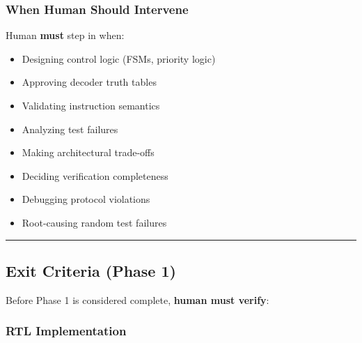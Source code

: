 \subsubsection{When Human Should Intervene}\label{cr:status:phase1-ai-human-responsibilities:when-human-should-intervene}

\begin{record}

Human \textbf{must} step in when:

\begin{itemize}
\tightlist
\item
  \hold{} Designing control logic (FSMs, priority logic)
\item
  \hold{} Approving decoder truth tables
\item
  \hold{} Validating instruction semantics
\item
  \hold{} Analyzing test failures
\item
  \hold{} Making architectural trade-offs
\item
  \hold{} Deciding verification completeness
\item
  \hold{} Debugging protocol violations
\item
  \hold{} Root-causing random test failures
\end{itemize}

\begin{center}\rule{0.5\linewidth}{0.5pt}\end{center}

\end{record}

\subsection{Exit Criteria (Phase 1)}\label{cr:status:phase1-ai-human-responsibilities:exit-criteria-phase-1}

\begin{record}

Before Phase 1 is considered complete, \textbf{human must verify}:

\end{record}

\subsubsection{RTL Implementation}\label{cr:status:phase1-ai-human-responsibilities:rtl-implementation-1}

